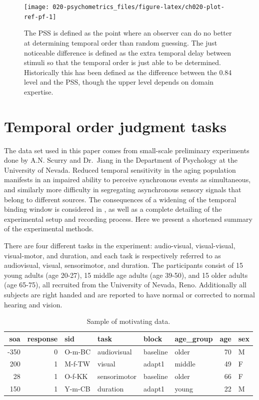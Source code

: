 \documentclass[11pt, oneside, openany]{scrbook}
\begin{document}
\begin{figure}

{\centering \texttt{[image: 020-psychometrics\_files/figure-latex/ch020-plot-ref-pf-1]} 

}

\caption{The PSS is defined as the point where an observer can do no better at determining temporal order than random guessing. The just noticeable difference is defined as the extra temporal delay between stimuli so that the temporal order is just able to be determined. Historically this has been defined as the difference between the 0.84 level and the PSS, though the upper level depends on domain expertise.}\label{fig:ch020-plot-ref-pf}
\end{figure}

\hypertarget{toj-task}{%
\section{Temporal order judgment tasks}\label{toj-task}}

The data set used in this paper comes from small-scale preliminary experiments done by A.N. Scurry and Dr.~Jiang in the Department of Psychology at the University of Nevada. Reduced temporal sensitivity in the aging population manifests in an impaired ability to perceive synchronous events as simultaneous, and similarly more difficulty in segregating asynchronous sensory signals that belong to different sources. The consequences of a widening of the temporal binding window is considered in \citet{scurry2019aging}, as well as a complete detailing of the experimental setup and recording process. Here we present a shortened summary of the experimental methods.

There are four different tasks in the experiment: audio-visual, visual-visual, visual-motor, and duration, and each task is respectively referred to as audiovisual, visual, sensorimotor, and duration. The participants consist of 15 young adults (age 20-27), 15 middle age adults (age 39-50), and 15 older adults (age 65-75), all recruited from the University of Nevada, Reno. Additionally all subjects are right handed and are reported to have normal or corrected to normal hearing and vision.

\begin{table}[!h]

\caption{\label{tab:ch020-multitask-data}Sample of motivating data.}
\centering
\begin{tabular}[t]{rrllllrl}
\toprule
soa & response & sid & task & block & age\_group & age & sex\\
\midrule
-350 & 0 & O-m-BC & audiovisual & baseline & older & 70 & M\\
200 & 1 & M-f-TW & visual & adapt1 & middle & 49 & F\\
28 & 1 & O-f-KK & sensorimotor & baseline & older & 66 & F\\
150 & 1 & Y-m-CB & duration & adapt1 & young & 22 & M\\
\bottomrule
\end{tabular}
\end{table}
\end{document}
